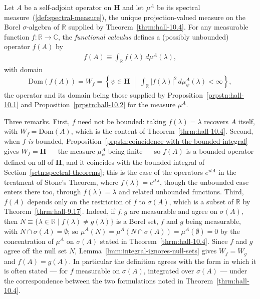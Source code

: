 \begin{definition}
    \label{def:hall-10.5}
    \leanok
    Let $A$ be a self-adjoint operator on $\mathbf{H}$ and let $\mu^A$ be its spectral measure~(\ref{def:spectral-measure}), the unique projection-valued measure on the Borel $\sigma$-algebra of $\mathbb{R}$ supplied by Theorem~\ref{thrm:hall-10.4}. For any measurable function $f : \mathbb{R} \to \mathbb{C}$, the \textit{functional calculus} defines a (possibly unbounded) operator $f(A)$ by
    \begin{align}
        f(A) \equiv \int_{\mathbb{R}} f(\lambda) \, d\mu^A(\lambda),
    \end{align}
    with domain
    \begin{align}
        \text{Dom}(f(A)) = W_f = \left\{ \psi \in \mathbf{H} \;\middle|\; \int_{\mathbb{R}} \lvert f(\lambda) \rvert^2 \, d\mu^A_\psi(\lambda) < \infty \right\},
    \end{align}
    the operator and its domain being those supplied by Proposition~\ref{prpstn:hall-10.1} and Proposition~\ref{prpstn:hall-10.2} for the measure $\mu^A$.

    Three remarks. First, $f$ need not be bounded: taking $f(\lambda) = \lambda$ recovers $A$ itself, with $W_f = \text{Dom}(A)$, which is the content of Theorem~\ref{thrm:hall-10.4}. Second, when $f$ \textit{is} bounded, Proposition~\ref{prpstn:coincidence-with-the-bounded-integral} gives $W_f = \mathbf{H}$ — the measure $\mu^A_\psi$ being finite — so $f(A)$ is a bounded operator defined on all of $\mathbf{H}$, and it coincides with the bounded integral of Section~\ref{sctn:spectral-theorems}; this is the case of the operators $e^{itA}$ in the treatment of Stone's Theorem, where $f(\lambda) = e^{it\lambda}$, though the unbounded case enters there too, through $f(\lambda) = \lambda$ and related unbounded functions. Third, $f(A)$ depends only on the restriction of $f$ to $\sigma(A)$, which is a subset of $\mathbb{R}$ by Theorem~\ref{thrm:hall-9.17}. Indeed, if $f, g$ are measurable and agree on $\sigma(A)$, then $N \equiv \{ \lambda \in \mathbb{R} \mid f(\lambda) \ne g(\lambda) \}$ is a Borel set, $f$ and $g$ being measurable, with $N \cap \sigma(A) = \emptyset$; so $\mu^A(N) = \mu^A(N \cap \sigma(A)) = \mu^A(\emptyset) = 0$ by the concentration of $\mu^A$ on $\sigma(A)$ stated in Theorem~\ref{thrm:hall-10.4}. Since $f$ and $g$ agree off the null set $N$, Lemma~\ref{lmm:integral-ignores-null-sets} gives $W_f = W_g$ and $f(A) = g(A)$. In particular the definition agrees with the form in which it is often stated — for $f$ measurable on $\sigma(A)$, integrated over $\sigma(A)$ — under the correspondence between the two formulations noted in Theorem~\ref{thrm:hall-10.4}.
\end{definition}

